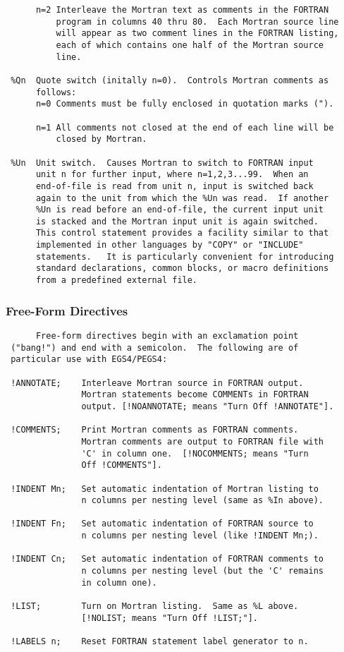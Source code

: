 \begin{verbatim}
      n=2 Interleave the Mortran text as comments in the FORTRAN
          program in columns 40 thru 80.  Each Mortran source line
          will appear as two comment lines in the FORTRAN listing,
          each of which contains one half of the Mortran source
          line.
 
 %Qn  Quote switch (initally n=0).  Controls Mortran comments as
      follows:
      n=0 Comments must be fully enclosed in quotation marks (").
 
      n=1 All comments not closed at the end of each line will be
          closed by Mortran.
 
 %Un  Unit switch.  Causes Mortran to switch to FORTRAN input
      unit n for further input, where n=1,2,3...99.  When an
      end-of-file is read from unit n, input is switched back
      again to the unit from which the %Un was read.  If another
      %Un is read before an end-of-file, the current input unit
      is stacked and the Mortran input unit is again switched.
      This control statement provides a facility similar to that
      implemented in other languages by "COPY" or "INCLUDE"
      statements.   It is particularly convenient for introducing
      standard declarations, common blocks, or macro definitions
      from a predefined external file.
 \end{verbatim}
 \subsubsection{Free-Form Directives}
 \begin{verbatim}
      Free-form directives begin with an exclamation point
 ("bang!") and end with a semicolon.  The following are of
 particular use with EGS4/PEGS4:
 
 !ANNOTATE;    Interleave Mortran source in FORTRAN output.
               Mortran statements become COMMENTs in FORTRAN
               output. [!NOANNOTATE; means "Turn Off !ANNOTATE"].
 
 !COMMENTS;    Print Mortran comments as FORTRAN comments.
               Mortran comments are output to FORTRAN file with
               'C' in column one.  [!NOCOMMENTS; means "Turn
               Off !COMMENTS"].
 
 !INDENT Mn;   Set automatic indentation of Mortran listing to
               n columns per nesting level (same as %In above).
 
 !INDENT Fn;   Set automatic indentation of FORTRAN source to
               n columns per nesting level (like !INDENT Mn;).
 
 !INDENT Cn;   Set automatic indentation of FORTRAN comments to
               n columns per nesting level (but the 'C' remains
               in column one).
 
 !LIST;        Turn on Mortran listing.  Same as %L above.
               [!NOLIST; means "Turn Off !LIST;"].
 
 !LABELS n;    Reset FORTRAN statement label generator to n.
\end{verbatim}
